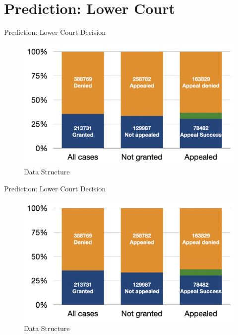 \section{Prediction: Lower Court}
    
    \frame{\sectionpage}

\begin{frame}{Prediction: Lower Court Decision}

    \begin{figure}\label{fig:trial_structure}
    \centering
    \includegraphics[height = 0.65 \textheight]{images/fig_data.png}
    \caption{Data Structure}
    \end{figure}
    
\end{frame}

\begin{frame}{Prediction: Lower Court Decision}

    \begin{figure}\label{fig:trial_structure}
    \centering
    \includegraphics[height = 0.65 \textheight]{images/fig_data.png}
    \caption{Data Structure}
    \end{figure}
    
\end{frame}

